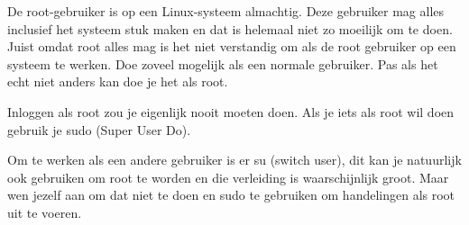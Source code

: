 De root-gebruiker is op een Linux-systeem almachtig. Deze gebruiker mag alles inclusief het systeem stuk maken en dat is helemaal niet zo moeilijk om te doen. Juist omdat root alles mag is het niet verstandig om als de root gebruiker op een systeem te werken. Doe zoveel mogelijk als een normale gebruiker. Pas als het echt niet anders kan doe je het als root.

Inloggen als root zou je eigenlijk nooit moeten doen. Als je iets als root wil doen gebruik je sudo (Super User Do).

Om te werken als een andere gebruiker is er su (switch user), dit kan je natuurlijk ook gebruiken om root te worden en die verleiding is waarschijnlijk groot. Maar wen jezelf aan om dat niet te doen en sudo te gebruiken om handelingen als root uit te voeren.
